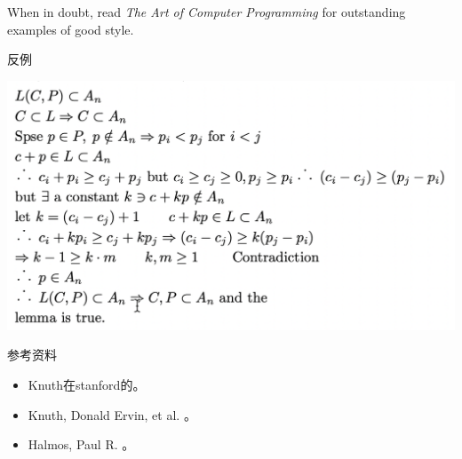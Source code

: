 \documentclass[presentation]{beamer}
\begin{document}
\begin{frame}[label={sec:org91e7fe1}]{27}
When in doubt, read \emph{The Art of Computer Programming} for outstanding examples of good style.
\end{frame}

\begin{frame}[label={sec:org24313be}]{反例}
\begin{H}
\centering
\includegraphics[width=.8\textwidth]{./1.png}
\label{}
\end{H}
\end{frame}

\begin{frame}[label={sec:orgfa1bdc7}]{参考资料}
\begin{itemize}
\item Knuth在stanford的\href{https://www.youtube.com/watch?v=mert0kmZvVM}{\color{blue}{授课视频}}。
\item Knuth, Donald Ervin, et al. \href{https://jmlr.csail.mit.edu/reviewing-papers/knuth\_mathematical\_writing.pdf}{\color{blue}{Mathematical writing}}。
\item Halmos, Paul R.  \href{https://entropiesschool.sciencesconf.org/data/How\_to\_Write\_Mathematics.pdf}{\color{blue}{How to write mathematics}}。
\end{itemize}
\end{frame}
\end{document}
